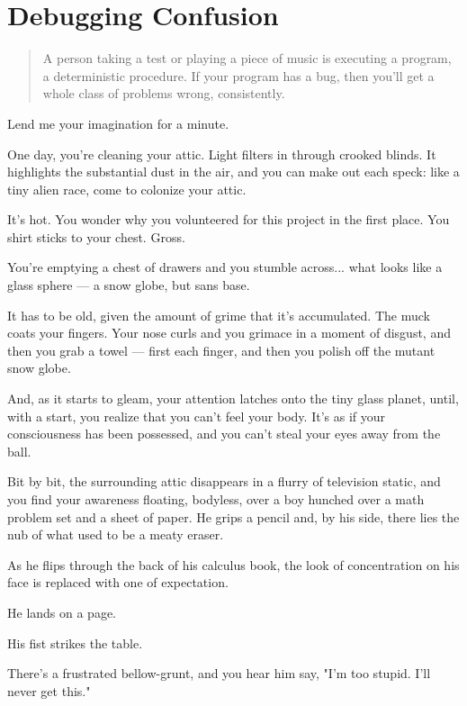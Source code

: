 \section{Debugging Confusion}
\begin{quote}
A person taking a test or playing a piece of music is executing a program, a
deterministic procedure.  If your program has a bug, then you'll get a whole
class of problems wrong, consistently.
\end{quote}

Lend me your imagination for a minute.

One day, you're cleaning your attic. Light filters in through crooked blinds. It
highlights the substantial dust in the air, and you can make out
each speck: like a tiny alien race, come to colonize your attic. 

It's hot. You wonder why you volunteered for this project in the first
place. You shirt sticks to your chest. Gross.

You're emptying a chest of drawers and you stumble across...  what
looks like a glass sphere --- a snow globe, but sans base.

It has to be old, given the amount of grime that it's accumulated. The muck
coats your fingers. Your nose curls and you grimace in a moment of disgust, and then you grab a
towel --- first each finger, and then you polish off the mutant snow
globe.

And, as it starts to gleam, your attention latches onto the tiny glass planet,
until, with a start, you realize that you can't feel your body. It's as if your
consciousness has been possessed, and you can't steal your eyes away from the
ball.

Bit by bit, the surrounding attic disappears in a flurry of television static, and you find your awareness floating,
bodyless, over a boy hunched over a math problem set and a sheet of paper. He
grips a pencil and, by his side, there lies the nub of what used to be a meaty
eraser.

As he flips through the back of his calculus book, the look of concentration on
his face is replaced with one of expectation.

He lands on a page. 

His fist strikes the table.

There's a frustrated bellow-grunt, and you hear him say, "I'm too stupid. I'll
never get this."

